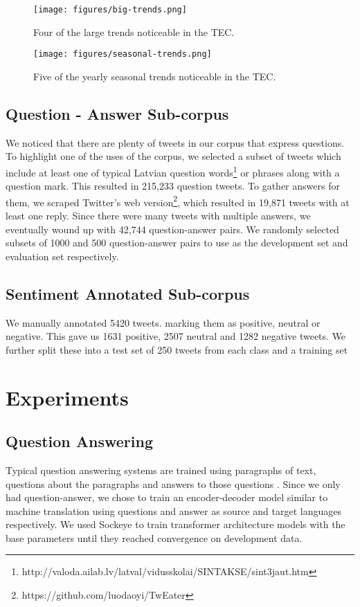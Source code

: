 \documentclass{IOS-Book-Article}
\begin{document}
\begin{figure}[t]
    \texttt{[image: figures/big-trends.png]}
    \caption{Four of the large trends noticeable in the TEC.}
    \label{fig:big-trends}
\end{figure}

\begin{figure}[t]
    \texttt{[image: figures/seasonal-trends.png]}
    \caption{Five of the yearly seasonal trends noticeable in the TEC.}
    \label{fig:seasonal-trends}
\end{figure}


\subsection{Question - Answer Sub-corpus}
We noticed that there are plenty of tweets in our corpus that express questions. To highlight one of the uses of the corpus, we selected a subset of tweets which include at least one of typical Latvian question words\footnote{http://valoda.ailab.lv/latval/vidusskolai/SINTAKSE/sint3jaut.htm} or phrases along with a question mark. This resulted in 215,233 question tweets. To gather answers for them, we scraped Twitter's web version\footnote{https://github.com/luodaoyi/TwEater}, which resulted in 19,871 tweets with at least one reply. Since there were many tweets with multiple answers, we eventually wound up with 42,744 question-answer pairs. We randomly selected subsets of 1000 and 500 question-answer pairs to use as the development set and evaluation set respectively.

\subsection{Sentiment Annotated Sub-corpus}
We manually annotated 5420 tweets. marking them as positive, neutral or negative. This gave us 1631 positive, 2507 neutral and 1282 negative tweets. We further split these into a test set of 250 tweets from each class and a training set 

\section{Experiments}
\subsection{Question Answering}
\label{sec:qa-exp}
Typical question answering systems are trained using paragraphs of text, questions about the paragraphs and answers to those questions \cite{rajpurkar-etal-2016-squad}. Since we only had question-answer, we chose to train an encoder-decoder model similar to machine translation using questions and answer as source and target languages respectively. We used Sockeye \cite{Sockeye:17} to train transformer architecture models with the base parameters until they reached convergence on development data.
\end{document}
